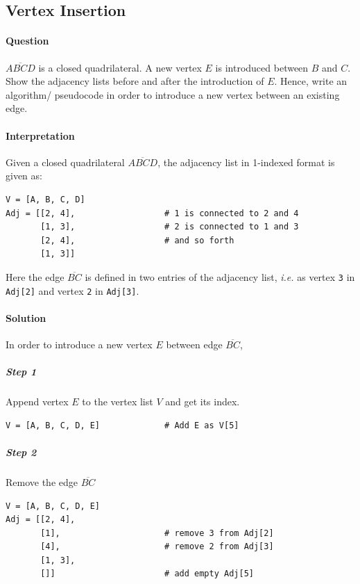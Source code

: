 \documentclass[11pt]{article}
\begin{document}
\subsection{Vertex Insertion}
\label{sec:org8908407}
\paragraph*{Question}
\label{sec:org1209108}

\(\overline{\mathit{ABCD}}\) is a closed quadrilateral.
A new vertex \(E\) is introduced between \(B\) and \(C\).
Show the adjacency lists before and after the
introduction of \(E\).  Hence, write an algorithm/
pseudocode in order to introduce a new vertex between
an existing edge.

\paragraph*{Interpretation}
\label{sec:org3e6b2bc}
Given a closed quadrilateral
\(\overline{\mathit{ABCD}}\), the adjacency list in
1-indexed format is given as:

\begin{verbatim}
V = [A, B, C, D]
Adj = [[2, 4],                  # 1 is connected to 2 and 4
       [1, 3],                  # 2 is connected to 1 and 3
       [2, 4],                  # and so forth
       [1, 3]]
\end{verbatim}

Here the edge \(\overline{\mathit{BC}}\) is defined in
two entries of the adjacency list, \emph{i.e.} as vertex \texttt{3}
in \texttt{Adj[2]} and vertex \texttt{2} in \texttt{Adj[3]}.

\paragraph*{Solution}
\label{sec:org0d5868c}

In order to introduce a new vertex \(E\) between edge
\(\overline{\mathit{BC}}\),

\subparagraph*{Step 1}
\label{sec:org14d35fb}
Append vertex \(E\) to the vertex list \(V\) and get its
index.

\begin{verbatim}
V = [A, B, C, D, E]             # Add E as V[5]
\end{verbatim}

\subparagraph*{Step 2}
\label{sec:orgf0437b0}
Remove the edge  \(\overline{\mathit{BC}}\)
\begin{verbatim}
V = [A, B, C, D, E]
Adj = [[2, 4],
       [1],                     # remove 3 from Adj[2]
       [4],                     # remove 2 from Adj[3]
       [1, 3],
       []]                      # add empty Adj[5]
\end{verbatim}
\end{document}
